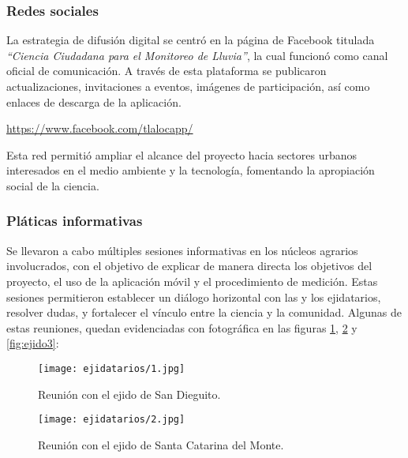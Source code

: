 \vspace{1em}

\subsubsection{Redes sociales}

La estrategia de difusión digital se centró en la página de Facebook titulada \textit{“Ciencia Ciudadana para el Monitoreo de Lluvia”}, la cual funcionó como canal oficial de comunicación. A través de esta plataforma se publicaron actualizaciones, invitaciones a eventos, imágenes de participación, así como enlaces de descarga de la aplicación.

\begin{center}
  \url{https://www.facebook.com/tlalocapp/}
\end{center}

Esta red permitió ampliar el alcance del proyecto hacia sectores urbanos interesados en el medio ambiente y la tecnología, fomentando la apropiación social de la ciencia.

\vspace{1em}

\subsubsection{Pláticas informativas}

Se llevaron a cabo múltiples sesiones informativas en los núcleos agrarios involucrados, con el objetivo de explicar de manera directa los objetivos del proyecto, el uso de la aplicación móvil y el procedimiento de medición. Estas sesiones permitieron establecer un diálogo horizontal con las y los ejidatarios, resolver dudas, y fortalecer el vínculo entre la ciencia y la comunidad. Algunas de estas reuniones, quedan evidenciadas con fotográfica en las figuras \ref{fig:ejido1}, \ref{fig:ejido2} y \ref{fig:ejido3}:

\begin{figure}[H]
  \centering
  \texttt{[image: ejidatarios/1.jpg]}
  \caption{Reunión con el ejido de San Dieguito.}
  \label{fig:ejido1}
\end{figure}

\begin{figure}[H]
  \centering
  \texttt{[image: ejidatarios/2.jpg]}
  \caption{Reunión con el ejido de Santa Catarina del Monte.}
  \label{fig:ejido2}
\end{figure}

